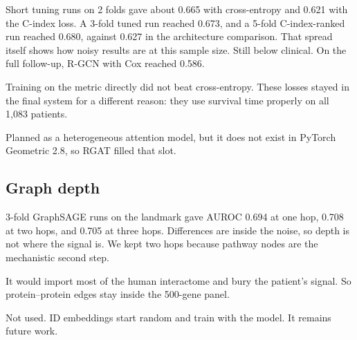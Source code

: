\documentclass[11pt,a4paper]{article}
\begin{document}
\begin{dropbox}
Short tuning runs on 2 folds gave about 0.665 with cross-entropy and 0.621 with the C-index loss. A 3-fold tuned run reached 0.673, and a 5-fold C-index-ranked run reached 0.680, against 0.627 in the architecture comparison. That spread itself shows how noisy results are at this sample size. Still below clinical. On the full follow-up, R-GCN with Cox reached 0.586.
\end{dropbox}
\begin{dropbox}
Training on the metric directly did not beat cross-entropy. These losses stayed in the final system for a different reason: they use survival time properly on all 1,083 patients.
\end{dropbox}
\begin{dropbox}[SimpleHGN]
Planned as a heterogeneous attention model, but it does not exist in PyTorch Geometric 2.8, so RGAT filled that slot.
\end{dropbox}

\subsection{Graph depth}
\begin{dropbox}
3-fold GraphSAGE runs on the landmark gave AUROC 0.694 at one hop, 0.708 at two hops, and 0.705 at three hops. Differences are inside the noise, so depth is not where the signal is. We kept two hops because pathway nodes are the mechanistic second step.
\end{dropbox}
\begin{dropbox}
It would import most of the human interactome and bury the patient's signal. So protein--protein edges stay inside the 500-gene panel.
\end{dropbox}
\begin{dropbox}
Not used. ID embeddings start random and train with the model. It remains future work.
\end{dropbox}
\end{document}
